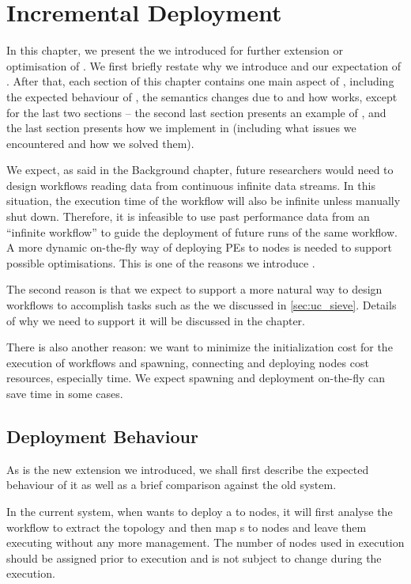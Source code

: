 \newcommand{\defNode}[1]{%
  \expandafter\def\csname nd#1\endcsname{\emph{#1}\xspace}}
\newcommand{\defNodes}[1]{\forcsvlist{\defNode}{#1}}

\chapter{Incremental Deployment}
In this chapter, we present the \tincdep we introduced for further extension or optimisation of \dpy. We first briefly restate why we introduce \tincdep and our expectation of \tincdep. After that, each section of this chapter contains one main aspect of \tincdep, including the expected behaviour of \tincdep, the semantics changes due to \tincdep and how \tincdep works, except for the last two sections -- the second last section presents an example of \tincdep, and the last section presents how we implement \tincdep in \dpy (including what issues we encountered and how we solved them).

We expect, as said in the Background chapter, future researchers would need to design workflows reading data from continuous infinite data streams. In this situation, the execution time of the workflow will also be infinite unless manually shut down. Therefore, it is infeasible to use past performance data from an ``infinite workflow'' to guide the deployment of future runs of the same workflow. A more dynamic on-the-fly way of deploying PEs to nodes is needed to support possible optimisations. This is one of the reasons we introduce \tincdep.

The second reason is that we expect to support a more natural way to design workflows to accomplish tasks such as the \tsieve we discussed in \ref{sec:uc_sieve}. Details of why we need \tincdep to support it will be discussed in the  chapter.

There is also another reason: we want to minimize the initialization cost for the execution of workflows and spawning, connecting and deploying nodes cost resources, especially time. We expect spawning and deployment on-the-fly can save time in some cases.

\section{Deployment Behaviour}
As \tincdep is the new extension we introduced, we shall first describe the expected behaviour of it as well as a brief comparison against the old system.

In the current \dpy system, when \dpy wants to deploy a \tPEInst to nodes, it will first analyse the workflow to extract the topology and then map \tPEInst{}s to nodes and leave them executing without any more management. The number of nodes used in execution should be assigned prior to execution and is not subject to change during the execution.

